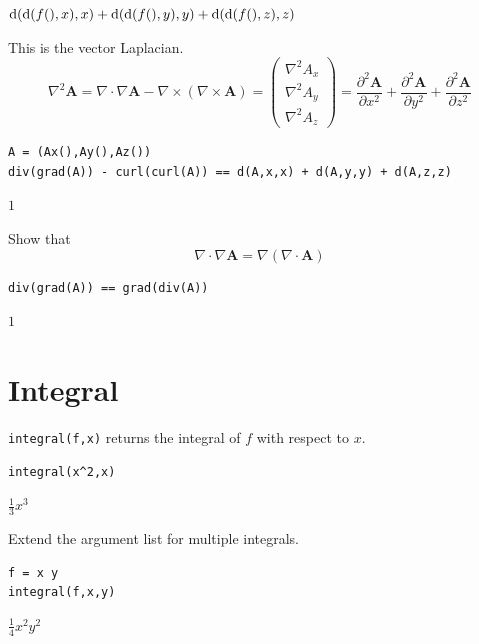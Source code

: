 \documentclass[12pt]{article}
\begin{document}
$\displaystyle
\operatorname{\rm d}(\operatorname{\rm d}(f(),x),x)
+\operatorname{\rm d}(\operatorname{\rm d}(f(),y),y)
+\operatorname{\rm d}(\operatorname{\rm d}(f(),z),z)
$

\bigskip
This is the vector Laplacian.
\begin{equation*}
\nabla^2\mathbf A
=\nabla\cdot\nabla\mathbf A-\nabla\times(\nabla\times\mathbf A)
=\begin{pmatrix}
\nabla^2A_x
\\
\nabla^2A_y
\\
\nabla^2A_z
\end{pmatrix}
=\frac{\partial^2\mathbf A}{\partial x^2}
+\frac{\partial^2\mathbf A}{\partial y^2}
+\frac{\partial^2\mathbf A}{\partial z^2}
\end{equation*}

{\color{blue}
\begin{verbatim}
A = (Ax(),Ay(),Az())
div(grad(A)) - curl(curl(A)) == d(A,x,x) + d(A,y,y) + d(A,z,z)
\end{verbatim}}

$1$

\bigskip
Show that
\begin{equation*}
\nabla\cdot\nabla\mathbf A=\nabla(\nabla\cdot\mathbf A)
\end{equation*}

{\color{blue}
\begin{verbatim}
div(grad(A)) == grad(div(A))
\end{verbatim}}

$1$

\newpage

\section{Integral}

\verb$integral(f,x)$ returns the integral of $f$ with respect to $x$.

{\color{blue}
\begin{verbatim}
integral(x^2,x)
\end{verbatim}
}

$\displaystyle \tfrac{1}{3}x^3$

\bigskip
Extend the argument list for multiple integrals.

{\color{blue}
\begin{verbatim}
f = x y
integral(f,x,y)
\end{verbatim}
}

$\displaystyle \tfrac{1}{4}x^2y^2$
\end{document}
